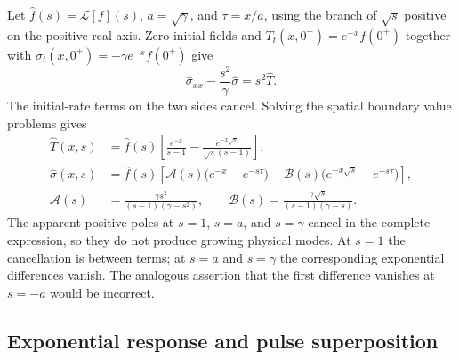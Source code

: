 \documentclass[11pt]{article}
\begin{document}
Let $\widehat f(s)=\mathcal L[f](s)$, $a=\sqrt\gamma$, and
$\tau=x/a$, using the branch of $\sqrt s$ positive on the positive real axis.
Zero initial fields and
$T_t(x,0^+)=e^{-x}f(0^+)$ together with
$\sigma_t(x,0^+)=-\gamma e^{-x}f(0^+)$ give
\begin{equation}
 \widehat\sigma_{xx}-\frac{s^2}{\gamma}\widehat\sigma
 =s^2\widehat T.
\end{equation}
The initial-rate terms on the two sides cancel. Solving the spatial boundary
value problems gives
\begin{align}
 \widehat T(x,s)
 &=\widehat f(s)\left[
 \frac{e^{-x}}{s-1}-\frac{e^{-x\sqrt s}}{\sqrt s(s-1)}\right],\\
 \widehat\sigma(x,s)
 &=\widehat f(s)\left[
 \mathcal{A}(s)\bigl(e^{-x}-e^{-s\tau}\bigr)
 -\mathcal{B}(s)\bigl(e^{-x\sqrt s}-e^{-s\tau}\bigr)\right],\\
 \mathcal{A}(s)&=\frac{\gamma s^2}{(s-1)(\gamma-s^2)},\qquad
 \mathcal{B}(s)=\frac{\gamma\sqrt s}{(s-1)(\gamma-s)}.
\end{align}
The apparent positive poles at $s=1$, $s=a$, and $s=\gamma$ cancel in
the complete expression, so they do not produce growing physical modes.
At $s=1$ the cancellation is between terms; at $s=a$ and $s=\gamma$
the corresponding exponential differences vanish. The analogous assertion
that the first difference vanishes at $s=-a$ would be incorrect.

\subsection{Exponential response and pulse superposition}
\end{document}
